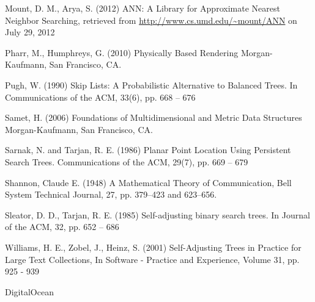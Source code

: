 \documentclass[mcs]{scsthesis}
\begin{document}
\begin{thebibliography}{5}
Mount, D. M., Arya, S. (2012) ANN: A Library for Approximate Nearest Neighbor
Searching, retrieved from \url{http://www.cs.umd.edu/~mount/ANN} on July 29, 2012 

Pharr, M., Humphreys, G. (2010) Physically Based Rendering
Morgan-Kaufmann, San Francisco, CA.  

Pugh, W. (1990) Skip Lists: A Probabilistic Alternative to Balanced Trees.
In Communications of the ACM, 33(6), pp. 668 – 676

Samet, H. (2006) Foundations of Multidimensional and Metric Data Structures
Morgan-Kaufmann, San Francisco, CA.

Sarnak, N. and Tarjan, R. E. (1986) Planar Point Location Using Persistent
Search Trees. Communications of the ACM, 29(7), pp. 669 -- 679

Shannon, Claude E. (1948) A Mathematical Theory of Communication,
Bell System Technical Journal, 27, pp. 379--423 and 623--656.

Sleator, D. D., Tarjan, R. E. (1985) Self-adjusting binary search trees.
In Journal of the ACM, 32, pp. 652 – 686

Williams, H. E., Zobel, J., Heinz, S. (2001) Self-Adjusting Trees in Practice
for Large Text Collections, In Software - Practice and Experience,
Volume 31, pp. 925 - 939

 DigitalOcean

\end{thebibliography}
\end{document}
